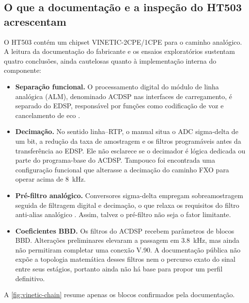 \documentclass[12pt,a4paper]{article}
\begin{document}
\FloatBarrier
\subsection{O que a documentação e a inspeção do HT503 acrescentam}

O HT503 contém um chipset VINETIC-2CPE/1CPE para o caminho analógico. A leitura da
documentação do fabricante e os ensaios exploratórios sustentam quatro conclusões,
ainda cautelosas quanto à implementação interna do componente:

\begin{itemize}
  \item \textbf{Separação funcional.} O processamento digital do módulo de linha
        analógica (ALM), denominado ACDSP nas interfaces de carregamento, é separado
        do EDSP, responsável por funções como codificação de voz e cancelamento de
        eco \cite{vinetic2006}.
  \item \textbf{Decimação.} No sentido linha--RTP, o manual situa o ADC sigma-delta
        de um bit, a redução da taxa de amostragem e os filtros programáveis antes da
        transferência ao EDSP. Ele não esclarece se o decimador é lógica dedicada ou
        parte do programa-base do ACDSP. Tampouco foi encontrada uma configuração
        funcional que alterasse a decimação do caminho FXO para operar acima de
        \SI{8}{kHz}.
  \item \textbf{Pré-filtro analógico.} Conversores sigma-delta empregam
        sobreamostragem seguida de filtragem digital e decimação, o que relaxa os
        requisitos do filtro anti-alias analógico \cite{pisani2023}. Assim, talvez
        o pré-filtro não seja o fator limitante.
  \item \textbf{Coeficientes BBD.} Os filtros do ACDSP recebem parâmetros de blocos
        BBD. Alterações preliminares elevaram a passagem em \SI{3.8}{kHz}, mas ainda
        não permitiram completar uma conexão V.90. A documentação pública não expõe
        a topologia matemática desses filtros nem o percurso exato do sinal entre
        seus estágios, portanto ainda não há base para propor um perfil definitivo.
\end{itemize}

A \cref{fig:vinetic-chain} resume apenas os blocos confirmados pela documentação.
\end{document}
